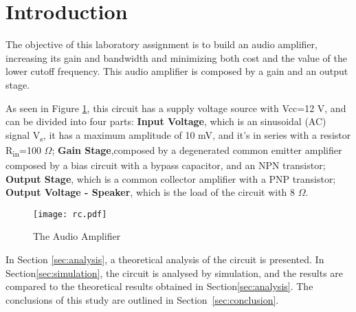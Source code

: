 \section{Introduction}
\label{sec:introduction}

The objective of this laboratory assignment is to build an audio amplifier, increasing its gain and bandwidth and minimizing both cost and the value of the lower cutoff frequency. This audio amplifier is composed by a gain and an output stage.

As seen in Figure \ref{fig:rc}, this circuit has a supply voltage source with Vcc=12 V, and can be divided into four parts: \textbf{Input Voltage}, which is an sinusoidal (AC) signal V\textsubscript s, it has a maximum amplitude of 10 mV, and it's in series with a resistor R\textsubscript{in}=100 $\Omega$; \textbf{Gain Stage},composed by a degenerated common emitter amplifier composed by a bias circuit with a bypass capacitor, and an NPN transistor; \textbf{Output Stage}, which is a common collector amplifier with a PNP transistor; \textbf{Output Voltage - Speaker}, which is the load of the circuit with 8 $\Omega$.


\begin{figure}[h] \centering
\texttt{[image: rc.pdf]}
\vspace{-5mm}
\caption{The Audio Amplifier}\label{fig:rc}
\end{figure}



In Section \ref{sec:analysis}, a theoretical analysis of the circuit is presented. In Section\ref{sec:simulation}, the circuit is analysed by simulation, and the results are compared to the theoretical results obtained in Section\ref{sec:analysis}. The conclusions of this study are outlined in Section~\ref{sec:conclusion}.





